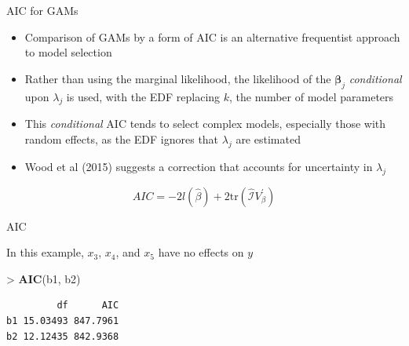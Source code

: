 \documentclass[10pt,ignorenonframetext,compress, aspectratio=169]{beamer}
\newenvironment{Shaded}{\begin{snugshade}}{\end{snugshade}}
\newcommand{\KeywordTok}[1]{\textcolor[rgb]{0.13,0.29,0.53}{\textbf{{#1}}}}
\newcommand{\StringTok}[1]{\textcolor[rgb]{0.31,0.60,0.02}{{#1}}}
\newcommand{\NormalTok}[1]{{#1}}
\providecommand{\tightlist}{%
  \setlength{\itemsep}{0pt}\setlength{\parskip}{0pt}}
\begin{document}
\begin{frame}{AIC for GAMs}

\begin{itemize}
\tightlist
\item
  Comparison of GAMs by a form of AIC is an alternative frequentist
  approach to model selection
\item
  Rather than using the marginal likelihood, the likelihood of the
  \(\mathbf{\beta}_j\) \emph{conditional} upon \(\lambda_j\) is used,
  with the EDF replacing \(k\), the number of model parameters
\item
  This \emph{conditional} AIC tends to select complex models, especially
  those with random effects, as the EDF ignores that \(\lambda_j\) are
  estimated
\item
  Wood et al (2015) suggests a correction that accounts for uncertainty
  in \(\lambda_j\)
\end{itemize}

\[
AIC = -2l(\hat{\beta}) + 2\mathrm{tr}(\widehat{\mathcal{I}}V^{'}_{\beta})
\]

\end{frame}

\begin{frame}[fragile]{AIC}

In this example, \(x_3\), \(x_4\), and \(x_5\) have no effects on \(y\)

\begin{Shaded}
\begin{Highlighting}[]
\NormalTok{>}\StringTok{ }\KeywordTok{AIC}\NormalTok{(b1, b2)}
\end{Highlighting}
\end{Shaded}

\begin{verbatim}
         df      AIC
b1 15.03493 847.7961
b2 12.12435 842.9368
\end{verbatim}

\end{frame}
\end{document}
